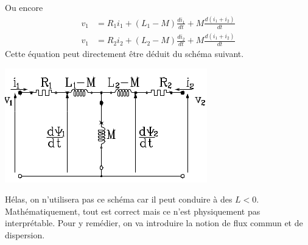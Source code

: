 		Ou encore
		\begin{equation}
		\begin{array}{ll}
		v_1 &= R_1i_1 + (L_1-M)\frac{di_1}{dt} + M\frac{d(i_1+i_2)}{dt}\\
		v_1 &= R_2i_2 + (L_2-M)\frac{di_2}{dt} + M\frac{d(i_1+i_2)}{dt}		
		\end{array}
		\end{equation}
		Cette équation peut directement être déduit du schéma suivant. 
		\begin{center}
				\includegraphics[scale=0.57]{ch3/image9.png}
		\end{center}
		Hélas, on n'utilisera pas ce schéma car il peut conduire à des $L<0$. 
		Mathématiquement, tout est correct mais ce n'est physiquement pas 
		interprétable. Pour y remédier, on va introduire la notion de flux commun 
		et de dispersion.
		
